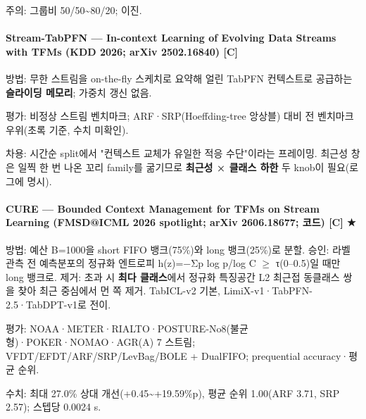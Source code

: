 \par\noindent \textbullet\enspace 주의: 그룹비 50/\allowbreak{}50\textasciitilde{}80/\allowbreak{}20; 이진.


\paragraph{Stream-TabPFN — In-context Learning of Evolving Data Streams with TFMs (KDD 2026; arXiv 2502.16840) [C]}
\par\noindent \textbullet\enspace 방법: 무한 스트림을 on-the-fly 스케치로 요약해 얼린 TabPFN 컨텍스트로 공급하는 \textbf{슬라이딩 메모리}; 가중치 갱신 없음.


\par\noindent \textbullet\enspace 평가: 비정상 스트림 벤치마크; ARF·SRP(Hoeffding-tree 앙상블) 대비 전 벤치마크 우위(초록 기준, 수치 미확인).


\par\noindent \textbullet\enspace 차용: 시간순 split에서 "컨텍스트 교체가 유일한 적응 수단"이라는 프레이밍. 최근성 창은 일찍 한 번 나온 꼬리 family를 굶기므로 \textbf{최근성 × 클래스 하한} 두 knob이 필요(로그에 명시).


\paragraph{CURE — Bounded Context Management for TFMs on Stream Learning (FMSD@ICML 2026 spotlight; arXiv 2606.18677; 코드) [C] ★}
\par\noindent \textbullet\enspace 방법: 예산 B=\allowbreak{}1000을 short FIFO 뱅크(75\%)와 long 뱅크(25\%)로 분할. 승인: 라벨 관측 전 예측분포의 정규화 엔트로피 h(z)=\allowbreak{}−Σp log p/\allowbreak{}log C \ensuremath{\geq} τ(0–0.5)일 때만 long 뱅크로. 제거: 초과 시 \textbf{최다 클래스}에서 정규화 특징공간 L2 최근접 동클래스 쌍을 찾아 최근 중심에서 먼 쪽 제거. TabICL-v2 기본, LimiX-v1·TabPFN-2.5·TabDPT-v1로 전이.


\par\noindent \textbullet\enspace 평가: NOAA·METER·RIALTO·POSTURE-No8(불균형)·POKER·NOMAO·AGR(A) 7 스트림; VFDT/\allowbreak{}EFDT/\allowbreak{}ARF/\allowbreak{}SRP/\allowbreak{}LevBag/\allowbreak{}BOLE +\allowbreak{} DualFIFO; prequential accuracy·평균 순위.


\par\noindent \textbullet\enspace 수치: 최대 27.0\% 상대 개선(+\allowbreak{}0.45\textasciitilde{}+\allowbreak{}19.59\%p), 평균 순위 1.00(ARF 3.71, SRP 2.57); 스텝당 0.0024 s.



